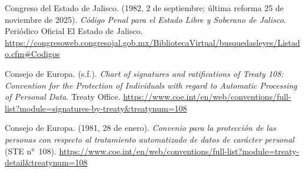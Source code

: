 \documentclass[12pt, a4paper]{article}
\begin{document}
\begin{list}{}{\setlength{\leftmargin}{1.27cm}\setlength{\itemindent}{-1.27cm}%
  \setlength{\labelwidth}{0pt}\setlength{\labelsep}{0pt}\setlength{\itemsep}{6pt}}
 
\item Congreso del Estado de Jalisco. (1982, 2 de septiembre; última
  reforma 25 de noviembre de 2025). \textit{Código Penal para el Estado
  Libre y Soberano de Jalisco}. Periódico Oficial El Estado de Jalisco. \url{https://congresoweb.congresojal.gob.mx/BibliotecaVirtual/busquedasleyes/Listado.cfm\#Codigos}
 
 
\item Consejo de Europa. (s.f.). \textit{Chart of signatures and
  ratifications of Treaty 108: Convention for the Protection of
  Individuals with regard to Automatic Processing of Personal Data}.
  Treaty Office. \url{https://www.coe.int/en/web/conventions/full-list?module=signatures-by-treaty&treatynum=108}
 

\item Consejo de Europa. (1981, 28 de enero). \textit{Convenio para
  la protección de las personas con respecto al tratamiento
  automatizado de datos de carácter personal} (STE n°~108).
  \url{https://www.coe.int/en/web/conventions/full-list?module=treaty-detail&treatynum=108}

 

\end{list}
\end{document}
